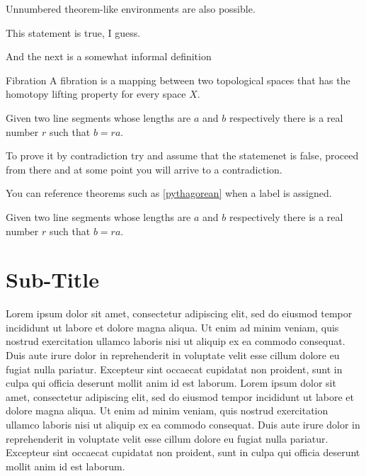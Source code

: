 Unnumbered theorem-like environments are also possible.
 
\begin{remark}
This statement is true, I guess.
\end{remark}
 
And the next is a somewhat informal definition
 
\theoremstyle{definition}
\begin{definition}{Fibration}
A fibration is a mapping between two topological spaces that has the homotopy lifting property for every space $X$.
\end{definition}

\begin{lemma}
Given two line segments whose lengths are $a$ and $b$ respectively there 
is a real number $r$ such that $b=ra$.
\end{lemma}
 
\begin{pro}
To prove it by contradiction try and assume that the statemenet is false,
proceed from there and at some point you will arrive to a contradiction.
\end{pro}

 
You can reference theorems such as \ref{pythagorean} when a label is assigned.
 
\begin{lemma}
Given two line segments whose lengths are $a$ and $b$ respectively there is a 
real number $r$ such that $b=ra$.
\end{lemma}

\section{Sub-Title}
Lorem ipsum dolor sit amet, consectetur adipiscing elit, sed do eiusmod tempor incididunt ut labore et dolore magna aliqua. Ut enim ad minim veniam, quis nostrud exercitation ullamco laboris nisi ut aliquip ex ea commodo consequat. Duis aute irure dolor in reprehenderit in voluptate velit esse cillum dolore eu fugiat nulla pariatur. Excepteur sint occaecat cupidatat non proident, sunt in culpa qui officia deserunt mollit anim id est laborum. Lorem ipsum dolor sit amet, consectetur adipiscing elit, sed do eiusmod tempor incididunt ut labore et dolore magna aliqua. Ut enim ad minim veniam, quis nostrud exercitation ullamco laboris nisi ut aliquip ex ea commodo consequat. Duis aute irure dolor in reprehenderit in voluptate velit esse cillum dolore eu fugiat nulla pariatur. Excepteur sint occaecat cupidatat non proident, sunt in culpa qui officia deserunt mollit anim id est laborum.  

